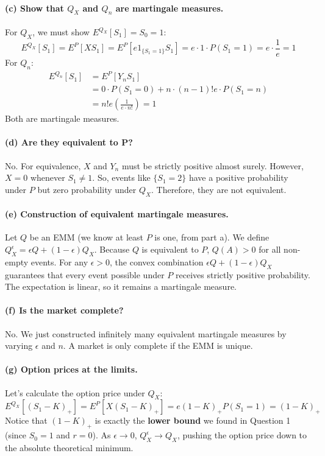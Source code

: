 \paragraph{(c) Show that $Q_{X}$ and $Q_{n}$ are martingale measures.}
For $Q_{X}$, we must show $E^{Q_{X}}[S_{1}] = S_{0} = 1$:
\begin{equation}
    E^{Q_{X}}[S_{1}] = E^{P}[X S_{1}] = E^{P}[e 1_{\{S_{1}=1\}} S_{1}] = e \cdot 1 \cdot P(S_{1}=1) = e \cdot \frac{1}{e} = 1
\end{equation}
For $Q_{n}$:
\begin{align}
    E^{Q_{n}}[S_{1}] &= E^{P}[Y_{n} S_{1}] \\
    &= 0 \cdot P(S_{1}=0) + n \cdot (n-1)!e \cdot P(S_{1}=n) \\
    &= n! e \left(\frac{1}{e \cdot n!}\right) = 1
\end{align}
Both are martingale measures.

\paragraph{(d) Are they equivalent to P?}
No. For equivalence, $X$ and $Y_{n}$ must be strictly positive almost surely. However, $X = 0$ whenever $S_{1} \ne 1$. So, events like $\{S_{1}=2\}$ have a positive probability under $P$ but zero probability under $Q_{X}$. Therefore, they are not equivalent.

\paragraph{(e) Construction of equivalent martingale measures.}
Let $Q$ be an EMM (we know at least $P$ is one, from part a). We define $Q_{X}^{\epsilon} = \epsilon Q + (1-\epsilon)Q_{X}$.
Because $Q$ is equivalent to $P$, $Q(A) > 0$ for all non-empty events. For any $\epsilon > 0$, the convex combination $\epsilon Q + (1-\epsilon)Q_{X}$ guarantees that every event possible under $P$ receives strictly positive probability. The expectation is linear, so it remains a martingale measure.

\paragraph{(f) Is the market complete?}
No. We just constructed infinitely many equivalent martingale measures by varying $\epsilon$ and $n$. A market is only complete if the EMM is unique.

\paragraph{(g) Option prices at the limits.}
Let's calculate the option price under $Q_{X}$:
\begin{equation}
    E^{Q_{X}}[(S_{1}-K)_{+}] = E^{P}[X(S_{1}-K)_{+}] = e(1-K)_{+}P(S_{1}=1) = (1-K)_{+}
\end{equation}
Notice that $(1-K)_{+}$ is exactly the \textbf{lower bound} we found in Question 1 (since $S_{0}=1$ and $r=0$). As $\epsilon \to 0$, $Q_{X}^{\epsilon} \to Q_{X}$, pushing the option price down to the absolute theoretical minimum.

